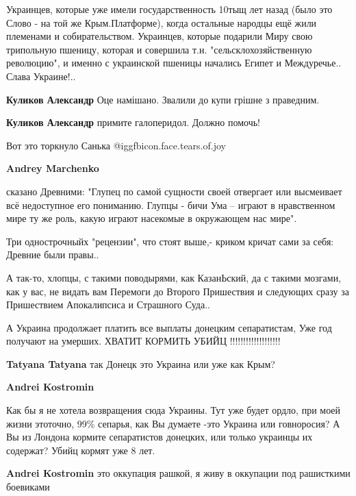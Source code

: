 \begin{itemize}
Украинцев, которые уже имели государственность 10тыщ лет назад (было это Слово
- на той же Крым.Платформе), когда остальные народцы ещё жили племенами и
собирательством. Украинцев, которые подарили Миру свою трипольную пшеницу,
которая и совершила т.н. "сельсклохозяйственную революцию", и именно с
украинской пшеницы начались Египет и Междуречье.. Слава Украине!..

\begin{itemize} %
\textbf{Куликов Александр} Оце намішано. Звалили до купи грішне з праведним.

\textbf{Куликов Александр} примите галоперидол. Должно помочь!

Вот это торкнуло Санька @igg{fbicon.face.tears.of.joy} 

\textbf{Andrey Marchenko} 

сказано Древними: "Глупец по самой сущности своей отвергает или высмеивает всё
недоступное его пониманию. Глупцы - бичи Ума – играют в нравственном мире ту же
роль, какую играют насекомые в окружающем нас мире".

Три однострочныйх "рецензии", что стоят выше,- криком кричат сами за себя:
Древние были правы..

А так-то, хлопцы, с такими поводырями, как КазанЬский, да с такими мозгами, как
у вас, не видать вам Перемоги до Второго Пришествия и следующих сразу за
Пришествием Апокалипсиса и Страшного Суда..

\end{itemize} %


А Украина продолжает платить все выплаты донецким сепаратистам, Уже год
получают на умерших. ХВАТИТ КОРМИТЬ УБИЙЦ !!!!!!!!!!!!!!!!!!!

\begin{itemize} %
\textbf{Tatyana Tatyana} так Донецк это Украина или уже как Крым?

\textbf{Andrei Kostromin} 

Как бы я не хотела возвращения сюда Украины. Тут уже будет ордло, при моей
жизни этоточно, 99\% сепарья, как Вы думаете -это Украина или говноросия? А Вы
из Лондона кормите сепаратистов донецких, или только украинцы их содержат?
Убийц кормят уже 8 лет.


\textbf{Andrei Kostromin} это оккупация рашкой, я живу в оккупации под рашисткими боевиками


\end{itemize}
\end{itemize}
